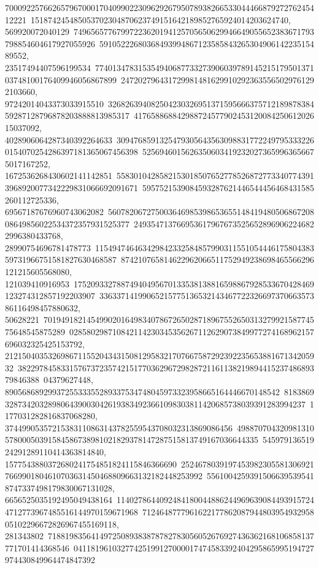 {{{70009225766265796700017040990223096292679507893826653304446687927276245412221\
151874245485053702304870623749151642189852765924014203624740, 569920072040129\
74965657767997223620194125705650629946649055652383671793798854604617927055926\
5910522268036849399486712358584326530490614223515489552, 23517494407596199534\
77401347831535494068773327390603978914521517950137103748100176409946056867899\
2472027964317299814816299102923635565029761292103660, 97242014043373033915510\
32682639408250423032695137159566637571218987838459287128796878203888813985317\
41765886884298872457790245312008425061202615037092, 4028906064287340392264633\
30947685913254793056435630988317722497953332260154070254286397181365067456398\
52569460156263506034192320273659963656675017167252, 1672536268430602141142851\
55830104285821530185076527785268727733407743913968920077342229831066692091671\
5957521539084593287621446544456468431585260112725336, 69567187676960743062082\
56078206727500364698539865365514841948050686720808649856022534372357931525377\
2493547137669536179676735256528969062246822996380433768, 28990754696781478773\
11549474646342984233258485799031155105444617580438359731966751581827630468587\
874210765814622962066511752949238698465566296121215605568080, 121039410916953\
17520933278874940495670133538138816598867928533670428469123274312857192203907\
3363371419906521577513653214346772232669737066357386116498457880632, 50628221\
70194918214549902016498340786726502871896755265031327992158774575648545875289\
028580298710842114230345356267112629073849977274168962157696032325425153792, 
   21215040353269867115520434315081295832170766758729239223565388167134205932\
38229784583315767372357421517703629672982872116113821989441523748689379846388\
04379627448, 8905686892993725533355289337534748045973323958665164446670148542\
81838693287342032898064390030426193834923661098303811420685738039391283994237\
1177031282816837068280, 37449905357215383110863143782559543708032313869086456\
49887070432098131057800050391584586738981021829378147287515813749167036644335\
54597913651924291289110414363814840, 1577543880372680241754851824115846366690\
25246780391974539823055813069217669901804610703631450468809663132182448253992\
55610042593915066395395418747337498179830067131028, 6656525035192495049438164\
11402786440924841800448862449696390844939157244712773967485516144970159671968\
712464877796162217786208794480395493295805102296672826967455169118, 281343802\
71881983564149725089383878782783056052676927436362168106858137771701414368546\
04118196103277425199127000017474583392404295865995194727974430849964474847392\
}}}
